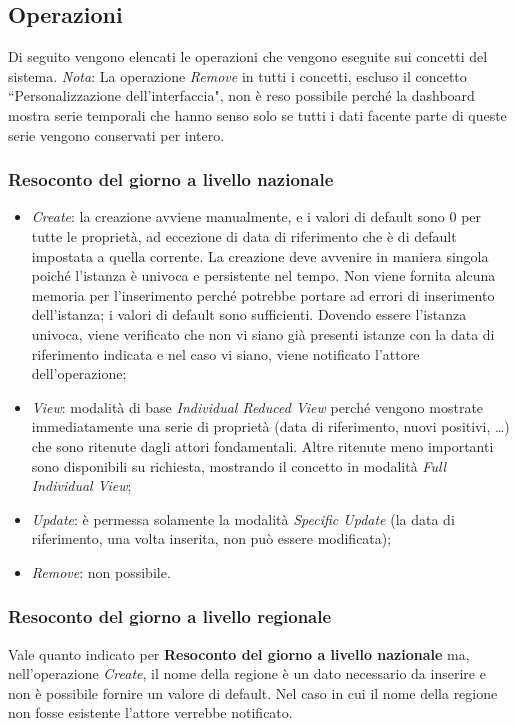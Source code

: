 \subsection{Operazioni}
Di seguito vengono elencati le operazioni che vengono eseguite sui concetti del sistema.
\noindent
\textit{Nota}: La operazione \textit{Remove} in tutti i concetti, escluso il concetto ``Personalizzazione dell'interfaccia", non è reso possibile perché la dashboard mostra serie temporali che hanno senso solo se tutti i dati facente parte di queste serie vengono conservati per intero.

\subsubsection{Resoconto del giorno a livello nazionale}
\begin{itemize}
    \item \textit{Create}: la creazione avviene manualmente, e i valori di default sono 0 per tutte le proprietà, ad eccezione di data di riferimento che è di default impostata a quella corrente.
    La creazione deve avvenire in maniera singola poiché l'istanza è univoca e persistente nel tempo.
    Non viene fornita alcuna memoria per l'inserimento perché potrebbe portare ad errori di inserimento dell'istanza; i valori di default sono sufficienti.
    Dovendo essere l'istanza univoca, viene verificato che non vi siano già presenti istanze con la data di riferimento indicata e nel caso vi siano, viene notificato l'attore dell'operazione;
    \item \textit{View}: modalità di base \textit{Individual Reduced View} perché vengono mostrate immediatamente una serie di proprietà (data di riferimento, nuovi positivi, \dots) che sono ritenute dagli attori fondamentali.
    Altre ritenute meno importanti sono disponibili su richiesta, mostrando il concetto in modalità \textit{Full Individual View};
    \item \textit{Update}: è permessa solamente la modalità \textit{Specific Update} (la data di riferimento, una volta inserita, non può essere modificata);
    \item \textit{Remove}: non possibile.
\end{itemize}

\subsubsection{Resoconto del giorno a livello regionale}
Vale quanto indicato per \textbf{Resoconto del giorno a livello nazionale} ma, nell'operazione \textit{Create}, il nome della regione è un dato necessario da inserire e non è possibile fornire un valore di default.
Nel caso in cui il nome della regione non fosse esistente l'attore verrebbe notificato.

